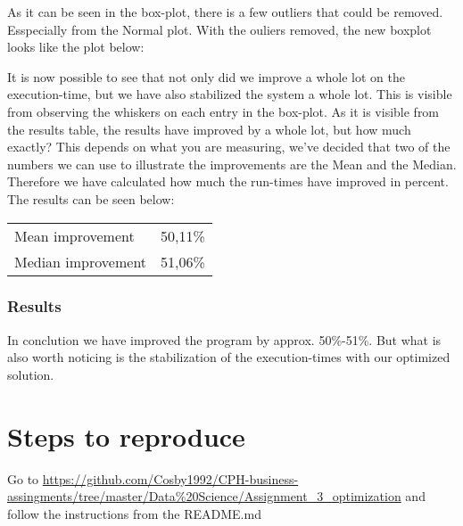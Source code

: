 \documentclass{article}
\begin{document}
As it can be seen in the box-plot, there is a few outliers that could be removed. Esspecially from the Normal plot. 
With the ouliers removed, the new boxplot looks like the plot below: 
\newline
{}

It is now possible to see that not only did we improve a whole lot on the execution-time,
but we have also stabilized the system a whole lot. This is visible from observing the 
whiskers on each entry in the box-plot. 
As it is visible from the results table, the results have improved by a whole lot, 
but how much exactly? This depends on what you are measuring, we've decided that 
two of the numbers we can use to illustrate the improvements are the Mean and the 
Median. Therefore we have calculated how much the run-times have improved in percent. 
The results can be seen below: \newline

\begin{tabular}{ l l }
Mean improvement & 50,11\% \\
Median improvement & 51,06\% \\ 
\end{tabular}

\subsubsection*{Results}
In conclution we have improved the program by approx. 50\%-51\%. 
But what is also worth noticing is the stabilization of the execution-times
with our optimized solution. 

\section{Steps to reproduce}
Go to \url{https://github.com/Cosby1992/CPH-business-assingments/tree/master/Data%20Science/Assignment_3_optimization} 
and follow the instructions from the README.md
\end{document}
